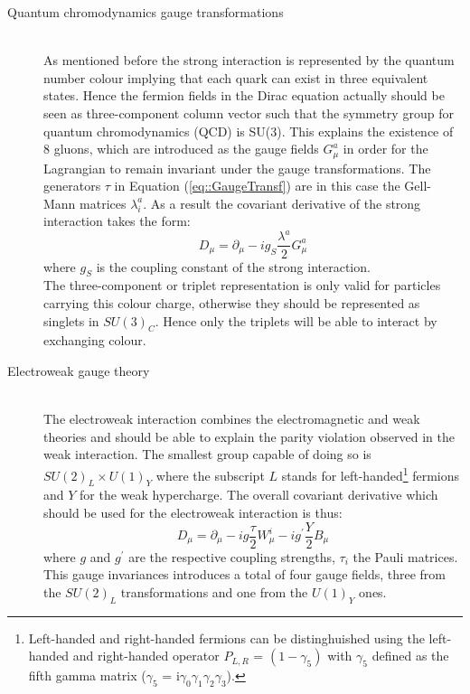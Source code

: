 \begin{myindentpar}
  \begin{description}
    \item[Quantum chromodynamics gauge transformations] \hfill \\
    As mentioned before the strong interaction is represented by the quantum number colour implying that each quark can exist in three equivalent states. Hence the fermion fields in the Dirac equation actually should be seen as three-component column vector such that the symmetry group for quantum chromodynamics (QCD) is SU(3). This explains the existence of 8 gluons, which are introduced as the gauge fields $G_{\mu}^{a}$ in order for the Lagrangian to remain invariant under the gauge transformations. The generators $\tau$ in Equation (\ref{eq::GaugeTransf}) are in this case the Gell-Mann matrices $\lambda_{i}^{a}$. As a result the covariant derivative of the strong interaction takes the form:
    \begin{equation}
      D_{\mu} = \partial_{\mu} - i g_{S} \frac{\lambda^{a}}{2} G_{\mu}^a
    \end{equation}
    where $g_{S}$ is the coupling constant of the strong interaction. \\
    The three-component or triplet representation is only valid for particles carrying this colour charge, otherwise they should be represented as singlets in $SU(3)_{C}$. Hence only the triplets will be able to interact by exchanging colour.
    
    \item[Electroweak gauge theory] \hfill \\
    The electroweak interaction combines the electromagnetic and weak theories and should be able to explain the parity violation observed in the weak interaction. The smallest group capable of doing so is $SU(2)_{L} \times U(1)_{Y}$ where the subscript $L$ stands for left-handed\footnote{
      Left-handed and right-handed fermions can be distinghuished using the left-handed and right-handed operator $P_{L,R}$ = $(1 - \gamma_{5})$ with $\gamma_5$ defined as the fifth gamma matrix ($\gamma_5$ = i$\gamma_0 \gamma_1 \gamma_2 \gamma_3$). 
    }
 fermions and $Y$ for the weak hypercharge. The overall covariant derivative which should be used for the electroweak interaction is thus:
    \begin{equation}
     D_{\mu} = \partial_{\mu} - i g \frac{\tau}{2} W_{\mu}^{i} - i g^{'} \frac{Y}{2} B_{\mu}
    \end{equation}
    where $g$ and $g^{'}$ are the respective coupling strengths, $\tau_{i}$ the Pauli matrices. This gauge invariances introduces a total of four gauge fields, three from the $SU(2)_L$ transformations and one from the $U(1)_Y$ ones.
    

\end{description}
\end{myindentpar}
